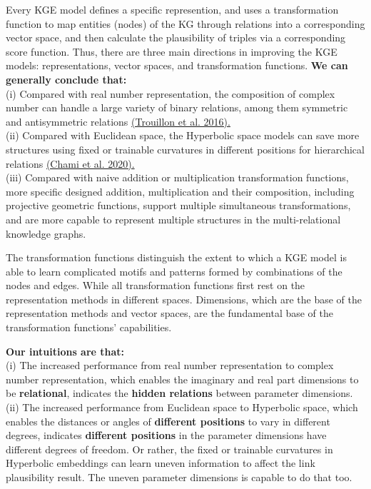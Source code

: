 \documentclass[9pt]{ctexart}
\theoremstyle{definition}
\begin{document}
Every KGE model defines a specific represention, and uses a transformation function to map entities (nodes) of the KG through relations into a corresponding vector space, and then calculate the plausibility of triples via a corresponding score function.
Thus, there are three main directions in improving the KGE models: representations, vector spaces, and transformation functions.
\textbf{We can generally conclude that:}\\
(i) Compared with real number representation, the composition of complex number can handle a large variety of binary relations, among them symmetric and antisymmetric relations
\hyperlink{Tro16}{(Trouillon et al. 2016).}\\
(ii) Compared with Euclidean space, the Hyperbolic space models can save more structures using fixed or trainable curvatures in different positions for hierarchical relations
\hyperlink{Cha20}{(Chami et al. 2020).}\\
(iii) Compared with naive addition or multiplication transformation functions, more specific designed addition, multiplication and their composition, including projective geometric functions, 
support multiple simultaneous transformations, and are more capable to represent multiple structures in the multi-relational knowledge graphs.

The transformation functions distinguish the extent to which a KGE model is able to learn complicated motifs and patterns formed by combinations of the nodes and edges.
While all transformation functions first rest on the representation methods in different spaces.
Dimensions, which are the base of the representation methods and vector spaces, are the fundamental base of the transformation functions' capabilities.

\textbf{Our intuitions are that:}\\ 
(i) The increased performance from real number representation to complex number representation, which enables the imaginary and real part dimensions to be \textbf{relational}, indicates the \textbf{hidden relations} between parameter dimensions.\\
(ii) The increased performance from Euclidean space to Hyperbolic space, which enables the distances or angles of \textbf{different positions} to vary in different degrees, indicates \textbf{different positions} in the parameter dimensions have different degrees of freedom. 
Or rather, the fixed or trainable curvatures in Hyperbolic embeddings can learn uneven information to affect the link plausibility result. The uneven parameter dimensions is capable to do that too.
\end{document}

